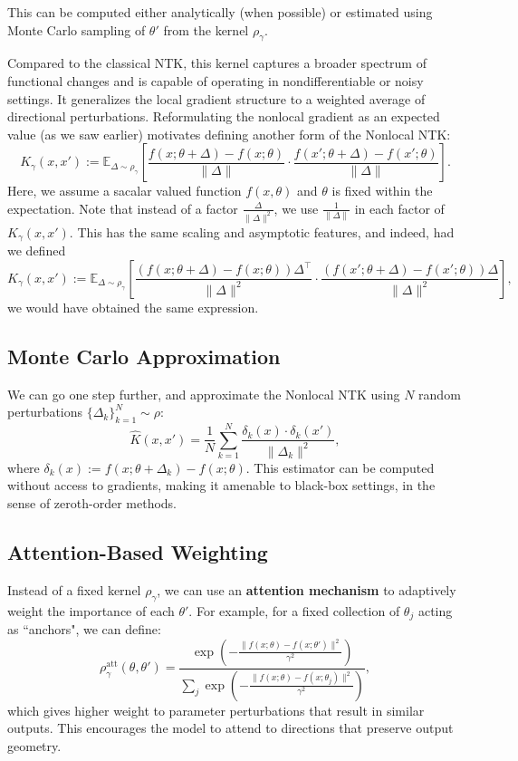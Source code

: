 \documentclass[11pt]{article}
\theoremstyle{plain}
\begin{document}
This can be computed either analytically (when possible) or estimated using Monte Carlo sampling of \( \theta' \) from the kernel \( \rho_\gamma \).

Compared to the classical NTK, this kernel captures a broader spectrum of functional changes and is capable of operating in nondifferentiable or noisy settings. It generalizes the local gradient structure to a weighted average of directional perturbations.
Reformulating the nonlocal gradient as an expected value (as we saw earlier) motivates defining another form of the Nonlocal NTK:
\[
K_\gamma(x, x') := \mathbb{E}_{\Delta \sim \rho_\gamma} \left[ \frac{f(x; \theta + \Delta) - f(x; \theta)}{\|\Delta\|} \cdot \frac{f(x'; \theta + \Delta) - f(x'; \theta)}{\|\Delta\|} \right].
\]
Here, we assume a sacalar valued function $f(x,\theta)$ and  $\theta$ is fixed within the expectation. Note that instead of a factor $\frac{\Delta}{\|\Delta\|^2}$, we use $\frac{1}{\|\Delta\|}$ in each factor of $K_\gamma(x, x')$. This has the same scaling and asymptotic features, and indeed, had we defined \[
K_\gamma(x, x') := \mathbb{E}_{\Delta \sim \rho_\gamma} \left[ \frac{(f(x; \theta + \Delta) - f(x; \theta))\Delta^\top}{\|\Delta\|^2} \cdot \frac{(f(x'; \theta + \Delta) - f(x'; \theta))\Delta}{\|\Delta\|^2} \right], 
\]we would have obtained the same expression.
\subsection{Monte Carlo Approximation}
We can go one step further, and approximate the Nonlocal NTK using $N$ random perturbations $\{\Delta_k\}_{k=1}^N \sim \rho$:
\[
\hat{K}(x, x') = \frac{1}{N} \sum_{k=1}^N \frac{\delta_k(x) \cdot \delta_k(x')}{\|\Delta_k\|^2},
\]
where $\delta_k(x) := f(x; \theta + \Delta_k) - f(x; \theta)$. This estimator can be computed without access to gradients, making it amenable to black-box settings, in the sense of zeroth-order methods.

\subsection{Attention-Based Weighting}

Instead of a fixed kernel \( \rho_\gamma \), we can use an \textbf{attention mechanism} to adaptively weight the importance of each \( \theta' \). For example, for a fixed collection of $\theta_j$ acting as ``anchors", we can define:
\[
\rho_\gamma^{\text{att}}(\theta, \theta') = \frac{\exp\left( -\frac{\|f(x; \theta) - f(x; \theta')\|^2}{\gamma^2} \right)}{\sum_j \exp\left( -\frac{\|f(x; \theta) - f(x; \theta_j)\|^2}{\gamma^2} \right)},
\]
which gives higher weight to parameter perturbations that result in similar outputs. This encourages the model to attend to directions that preserve output geometry.
\end{document}
